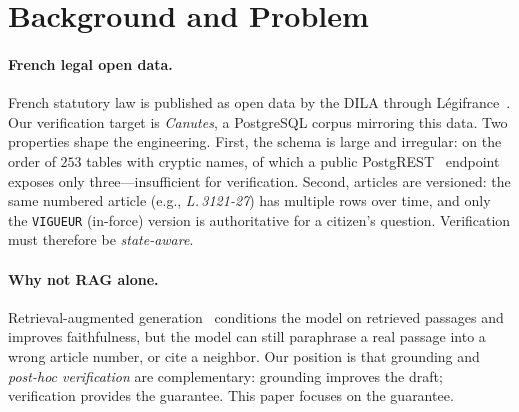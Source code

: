 \section{Background and Problem}
\label{sec:background}

\paragraph{French legal open data.}
French statutory law is published as open data by the DILA through
Légifrance~\cite{legifrance}. Our verification target is \emph{Canutes}, a
PostgreSQL corpus mirroring this data. Two properties shape the engineering.
First, the schema is large and irregular: on the order of $253$ tables with
cryptic names, of which a public PostgREST~\cite{postgrest} endpoint exposes
only three---insufficient for verification. Second, articles are versioned:
the same numbered article (e.g., \emph{L.\,3121-27}) has multiple rows over
time, and only the \texttt{VIGUEUR} (in-force) version is authoritative for a
citizen's question. Verification must therefore be \emph{state-aware}.

\paragraph{Why not RAG alone.}
Retrieval-augmented generation~\cite{lewis2020rag} conditions the model on
retrieved passages and improves faithfulness, but the model can still
paraphrase a real passage into a wrong article number, or cite a neighbor.
Our position is that grounding and \emph{post-hoc verification} are
complementary: grounding improves the draft; verification provides the
guarantee. This paper focuses on the guarantee.
